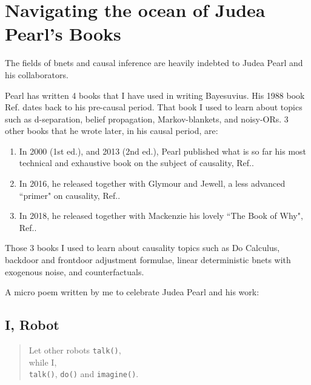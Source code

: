 \chapter{Navigating 
the ocean of Judea Pearl's Books}

\label{ch-nav-pearl}

The fields of bnets and causal inference are
heavily indebted to Judea Pearl and his
collaborators.

Pearl has written
4 books that I have used
in writing Bayesuvius.
His 
1988 book Ref.\cite{pearl-1988book}
dates back to his pre-causal period.
That book I used to learn
about topics such as
d-separation, belief propagation,
Markov-blankets, and noisy-ORs.
3 other books that  he  wrote later,
in his causal period, 
are:
\begin{enumerate}
\item
In 2000 (1st ed.), and 2013 (2nd ed.),
Pearl published what
is so far
his most technical
and exhaustive book
on the subject of causality,
Ref.\cite{pearl-2013book}.
\item
In 2016,
he released 
together
with Glymour and Jewell,
a less advanced ``primer"
on causality, Ref.\cite{pearl-primer}.
\item
In 2018, 
he released 
together with
Mackenzie his
lovely  ``The Book of Why",
 Ref.\cite{book-why}.
\end{enumerate}
Those 3 books I used to learn
about causality topics
such as Do Calculus,
backdoor and frontdoor
adjustment formulae,
linear 
deterministic 
bnets with exogenous noise,
and counterfactuals.

A micro poem written by me
to celebrate Judea Pearl and 
his work:
 
\section*{I, Robot}
\begin{verse}
Let other robots {\tt talk()},\\
while I,\\
{\tt talk()}, {\tt do()} and {\tt imagine()}.
\end{verse}
